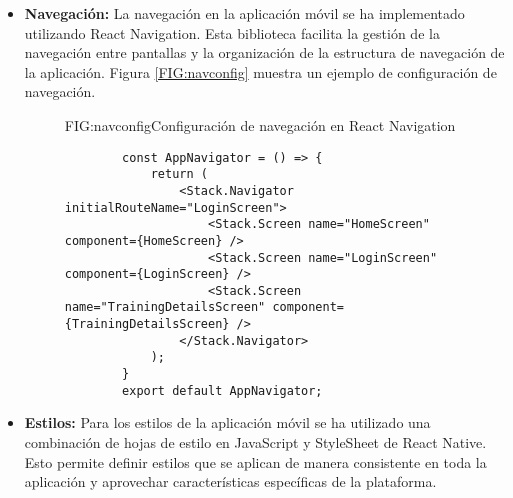 \begin{itemize}
\begin{itemize}
\begin{itemize}
\begin{itemize}
                \item \texttt{FoodDetailsScreen.js} - Pantalla de detalles de alimentos.
                \item \texttt{HomeScreen.js} - Pantalla de inicio.
                \item \texttt{LoginScreen.js} - Pantalla de inicio de sesión.
                \item \texttt{TodayScreen.js} - Muestra los entrenamientos y comidas del día.
                \item \texttt{TrainingDetailsScreen.js} - Pantalla de detalles del entrenamiento.
            \end{itemize}
        \end{itemize}
    \end{itemize}

    \item \textbf{Navegación:} La navegación en la aplicación móvil se ha implementado utilizando React Navigation. Esta biblioteca facilita la gestión de la navegación entre pantallas y la organización de la estructura de navegación de la aplicación. Figura \ref{FIG:navconfig} muestra un ejemplo de configuración de navegación.
    \begin{figure}[Configuración de Navegación]{FIG:navconfig}{Configuración de navegación en React Navigation}
    \begin{verbatim}
        const AppNavigator = () => {
            return (
                <Stack.Navigator initialRouteName="LoginScreen">
                    <Stack.Screen name="HomeScreen" component={HomeScreen} />
                    <Stack.Screen name="LoginScreen" component={LoginScreen} />
                    <Stack.Screen name="TrainingDetailsScreen" component={TrainingDetailsScreen} />
                </Stack.Navigator>
            );
        }
        export default AppNavigator;
    \end{verbatim}
    \end{figure}

    \item \textbf{Estilos:} Para los estilos de la aplicación móvil se ha utilizado una combinación de hojas de estilo en JavaScript y StyleSheet de React Native. Esto permite definir estilos que se aplican de manera consistente en toda la aplicación y aprovechar características específicas de la plataforma.


\end{itemize}
